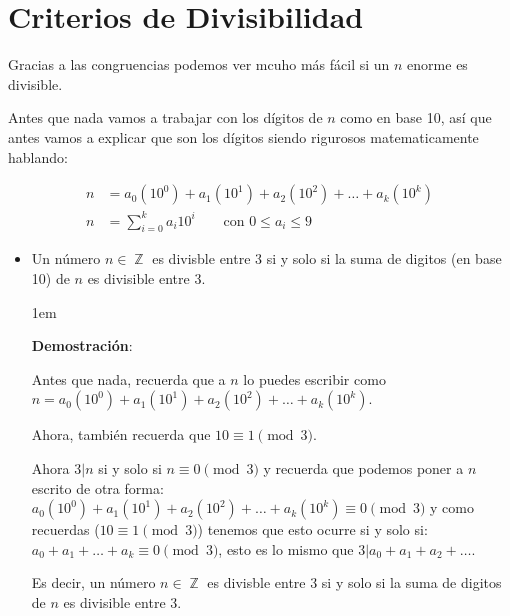 \documentclass[12pt]{report}                                    %
\newenvironment{SmallIndentation}[1][0.75em]                    %
    {\begin{adjustwidth}{#1}{}\begin{footnotesize}}                 %
    {\end{footnotesize}\end{adjustwidth}}                           %
\DeclareMathOperator \Space {\quad}                             %
\DeclareMathOperator \Integers  {\mathbb{Z}}                     %
\begin{document}
    \clearpage
    \section{Criterios de Divisibilidad}

        Gracias a las congruencias podemos ver mcuho más fácil si un $n$ enorme
        es divisible.

        Antes que nada vamos a trabajar con los dígitos de $n$ como en base 10,
        así que antes vamos a explicar que son los dígitos siendo rigurosos matematicamente
        hablando:

        \begin{equation}
        \begin{split}
            n &= a_0(10^0) + a_1(10^1) + a_2(10^2) + \dots + a_k(10^k)          \\
            n &= \sum_{i=0}^{k} a_i 10^i \Space \text{ con } 0 \leq a_i \leq 9
        \end{split}
        \end{equation}


        \begin{itemize}

            \item Un número $n \in \Integers$ es divisble entre 3 si y solo si
                la suma de digitos (en base 10) de $n$ es divisible entre 3.

                \begin{SmallIndentation}[1em]
                    \textbf{Demostración}:

                    Antes que nada, recuerda que a $n$ lo puedes escribir como
                    $n = a_0(10^0) + a_1(10^1) + a_2(10^2) + \dots + a_k(10^k)$.

                    Ahora, también recuerda que $10 \equiv 1 \pmod{3}$.

                    Ahora $3|n$ si y solo si $n \equiv 0 \pmod{3}$ y recuerda
                    que podemos poner a $n$ escrito de otra forma:
                    $a_0(10^0) + a_1(10^1) + a_2(10^2) + \dots + a_k(10^k) \equiv 0 \pmod{3}$
                    y como recuerdas ($10 \equiv 1 \pmod{3}$) tenemos que esto ocurre
                    si y solo si:  $a_0 + a_1 +\dots +a_k \equiv 0 \pmod{3}$, esto es lo mismo que
                    $3|a_0+a_1+a_2+\dots$.

                    Es decir, un número $n \in \Integers$ es divisble entre 3 si y solo si
                    la suma de digitos de $n$ es divisible entre 3.

                \end{SmallIndentation}

        \end{itemize}
\end{document}
